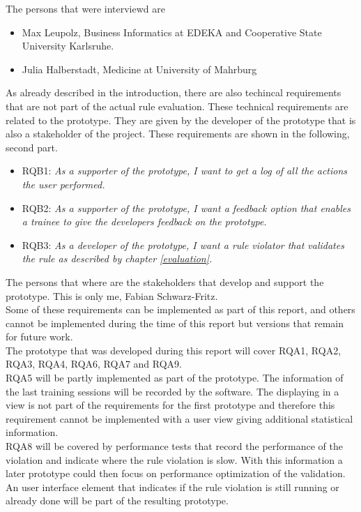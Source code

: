 The persons that were interviewd are
\begin{itemize}
  \item Max Leupolz, Business Informatics at EDEKA and Cooperative State University Karlsruhe. 
  \item Julia Halberstadt, Medicine at University of Mahrburg
\end{itemize}

As already described in the introduction, there are also techincal requirements that are not part of the actual rule evaluation. These technical requirements are related to the prototype. They are given by the developer of the prototype that is also a stakeholder of the project. These requirements are shown in the following, second part. 

\begin{itemize}
  \item RQB1: \textit{As a supporter of the prototype, I want to get a log of all the actions the user performed.}
  \item RQB2: \textit{As a supporter of the prototype, I want a feedback option that enables a trainee to give the developers feedback on the prototype.}
  \item RQB3: \textit{As a developer of the prototype, I want a rule violator that validates the rule as described by chapter \ref{evaluation}.}
\end{itemize}

The persons that where are the stakeholders that develop and support the prototype. This is only me, Fabian Schwarz-Fritz. 
\\

Some of these requirements can be implemented as part of this report, and others cannot be implemented during the time of this report but versions that remain for future work. 
\\

The prototype that was developed during this report will cover RQA1, RQA2, RQA3, RQA4, RQA6, RQA7 and RQA9. 
\\

RQA5 will be partly implemented as part of the prototype. The information of the last training sessions will be recorded by the software. The displaying in a view is not part of the requirements for the first prototype and therefore this requirement cannot be implemented with a user view giving additional statistical information. 
\\

RQA8 will be covered by performance tests that record the performance of the violation and indicate where the rule violation is slow. With this information a later prototype could then focus on performance optimization of the validation. An user interface element that indicates if the rule violation is still running or already done will be part of the resulting prototype.
\\

